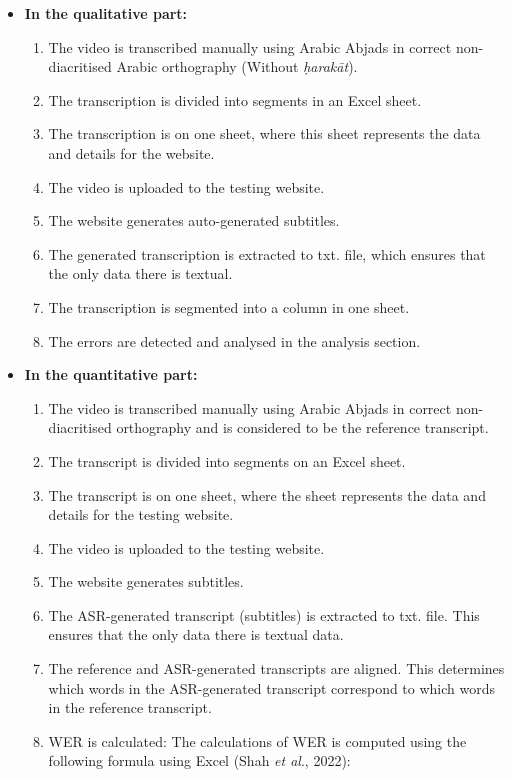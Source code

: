 \documentclass[english]{textolivre}
\begin{document}
\begin{itemize}
\item \textbf{In the qualitative part:}
	\begin{enumerate}
	\item The video is transcribed manually using Arabic Abjads in correct non-diacritised Arabic orthography (Without \emph{ḥarakāt}).
	\item The transcription is divided into segments in an Excel sheet.
	\item The transcription is on one sheet, where this sheet represents the data and details for the website.
	\item The video is uploaded to the testing website. 
	\item The website generates auto-generated subtitles.
	\item The generated transcription is extracted to txt. file, which ensures that the only data there is textual.
	\item The transcription is segmented into a column in one sheet.
	\item The errors are detected and analysed in the analysis section.
	\end{enumerate}
\item \textbf{In the quantitative part:}
	\begin{enumerate}
	\item The video is transcribed manually using Arabic Abjads in correct
	non-diacritised orthography and is considered to be the reference
	transcript.
	\item The transcript is divided into segments on an Excel sheet.
	\item The transcript is on one sheet, where the sheet represents the data
	and details for the testing website.
	\item The video is uploaded to the testing website.
	\item The website generates subtitles.
	\item The ASR-generated transcript (subtitles) is extracted to txt. file.
	This ensures that the only data there is textual data.
	\item The reference and ASR-generated transcripts are aligned. This
	determines which words in the ASR-generated transcript correspond to
	which words in the reference transcript.
	\item WER is calculated: The calculations of WER is computed using the
	following formula using Excel (Shah \emph{et al}., 2022):
	\end{enumerate}


\end{itemize}
\end{document}
